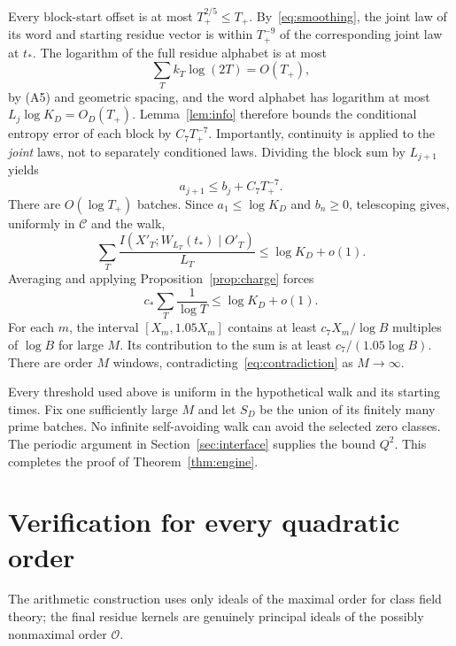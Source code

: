 \documentclass[11pt]{article}
\numberwithin{equation}{section}
\theoremstyle{definition}\newtheorem{definition}[theorem]{Definition}
\theoremstyle{remark}\newtheorem{remark}[theorem]{Remark}
\newcommand{\OO}{\mathcal O}\newcommand{\PP}{\mathcal P}
\begin{document}
Every block-start offset is at most $T_+^{2/5}\le T_+$. By~\eqref{eq:smoothing}, the joint law of its word and starting residue vector is within $T_+^{-9}$ of the corresponding joint law at $t_*$. The logarithm of the full residue alphabet is at most
\[
 \sum_T k_T\log(2T)=O(T_+),
\]
by (A5) and geometric spacing, and the word alphabet has logarithm at most $L_j\log K_D=O_D(T_+)$. Lemma~\ref{lem:info} therefore bounds the conditional entropy error of each block by $C_7T_+^{-7}$. Importantly, continuity is applied to the \emph{joint} laws, not to separately conditioned laws. Dividing the block sum by $L_{j+1}$ yields
\[
 a_{j+1}\le b_j+C_7T_+^{-7}.
\]
There are $O(\log T_+)$ batches. Since $a_1\le\log K_D$ and $b_n\ge0$, telescoping gives, uniformly in $\mathcal C$ and the walk,
\[
 \sum_T\frac{I(X'_T;W_{L_T}(t_*)\mid O'_T)}{L_T}
 \le\log K_D+o(1).
\]
Averaging and applying Proposition~\ref{prop:charge} forces
\begin{equation}\label{eq:contradiction}
 c_*\sum_T\frac1{\log T}\le\log K_D+o(1).
\end{equation}
For each $m$, the interval $[X_m,1.05X_m]$ contains at least $c_7X_m/\log B$ multiples of $\log B$ for large $M$. Its contribution to the sum is at least $c_7/(1.05\log B)$. There are order $M$ windows, contradicting~\eqref{eq:contradiction} as $M\to\infty$.

Every threshold used above is uniform in the hypothetical walk and its starting times. Fix one sufficiently large $M$ and let $S_D$ be the union of its finitely many prime batches. No infinite self-avoiding walk can avoid the selected zero classes. The periodic argument in Section~\ref{sec:interface} supplies the bound $Q^2$. This completes the proof of Theorem~\ref{thm:engine}.

\section{Verification for every quadratic order}\label{sec:arithmetic}

The arithmetic construction uses only ideals of the maximal order for class field theory; the final residue kernels are genuinely principal ideals of the possibly nonmaximal order $\OO$.
\end{document}
